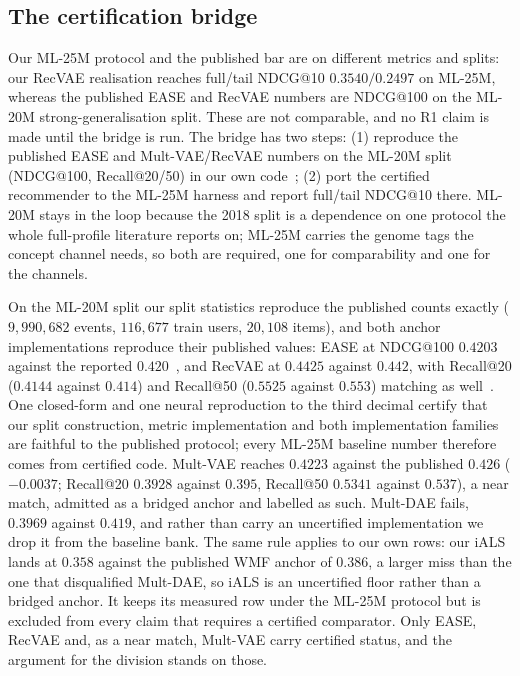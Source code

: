 \documentclass[manuscript,screen,review]{acmart}
\begin{document}
\subsection{The certification bridge}\label{sec:bridge}
Our ML-25M protocol and the published bar are on different metrics and splits: our RecVAE realisation reaches full/tail NDCG@10 $0.3540/0.2497$ on ML-25M, whereas the published EASE and RecVAE numbers are NDCG@100 on the ML-20M strong-generalisation split. These are not comparable, and no R1 claim is made until the bridge is run. The bridge has two steps: (1) reproduce the published EASE and Mult-VAE/RecVAE numbers on the ML-20M split (NDCG@100, Recall@20/50) in our own code~\citep{steck2019ease,liang2018variational,ren2020recvae}; (2) port the certified recommender to the ML-25M harness and report full/tail NDCG@10 there. ML-20M stays in the loop because the 2018 split is a dependence on one protocol the whole full-profile literature reports on; ML-25M carries the genome tags the concept channel needs, so both are required, one for comparability and one for the channels.

On the ML-20M split our split statistics reproduce the published counts exactly ($9{,}990{,}682$ events, $116{,}677$ train users, $20{,}108$ items), and both anchor implementations reproduce their published values: EASE at NDCG@100 $0.4203$ against the reported $0.420$~\citep{steck2019ease}, and RecVAE at $0.4425$ against $0.442$, with Recall@20 ($0.4144$ against $0.414$) and Recall@50 ($0.5525$ against $0.553$) matching as well~\citep{ren2020recvae}. One closed-form and one neural reproduction to the third decimal certify that our split construction, metric implementation and both implementation families are faithful to the published protocol; every ML-25M baseline number therefore comes from certified code. Mult-VAE reaches $0.4223$ against the published $0.426$ ($-0.0037$; Recall@20 $0.3928$ against $0.395$, Recall@50 $0.5341$ against $0.537$), a near match, admitted as a bridged anchor and labelled as such. Mult-DAE fails, $0.3969$ against $0.419$, and rather than carry an uncertified implementation we drop it from the baseline bank. The same rule applies to our own rows: our iALS lands at $0.358$ against the published WMF anchor of $0.386$, a larger miss than the one that disqualified Mult-DAE, so iALS is an uncertified floor rather than a bridged anchor. It keeps its measured row under the ML-25M protocol but is excluded from every claim that requires a certified comparator. Only EASE, RecVAE and, as a near match, Mult-VAE carry certified status, and the argument for the division stands on those.
\end{document}
